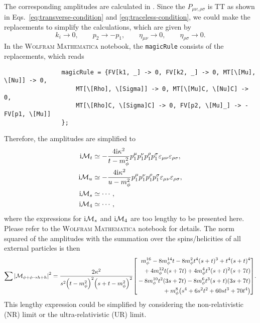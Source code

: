 \documentclass{article}
\begin{document}
            The corresponding amplitudes are calculated in .
            Since the $P_{\mu\nu, \rho\sigma}$ is TT as shown in Eqs.~\eqref{eq:transverse-condition} and \eqref{eq:traceless-condition}, we could make the replacements to simplify the calculations, which are given by
            \begin{equation}
                k_i \to 0, \qquad p_2 \to -p_1, \qquad \eta_{\mu\nu} \to 0, \qquad \eta_{\rho\sigma} \to 0.
            \end{equation}
            In the \textsc{Wolfram Mathematica} notebook, the \texttt{magicRule} consists of the replacements, which reads
            \begin{verbatim}
                magicRule = {FV[k1, _] -> 0, FV[k2, _] -> 0, MT[\[Mu], \[Nu]] -> 0, 
                    MT[\[Rho], \[Sigma]] -> 0, MT[\[Mu]C, \[Nu]C] -> 0, 
                    MT[\[Rho]C, \[Sigma]C] -> 0, FV[p2, \[Mu]_] -> -FV[p1, \[Mu]]
                };
            \end{verbatim}
            Therefore, the amplitudes are simplified to
            \begin{align}
                \iM[t] & \simeq -\frac{4 \ii \kappa^2}{t - m_\phi^2} p_1^\mu p_1^\nu p_1^\rho p_1^\sigma \varepsilon_{\mu\nu} \varepsilon_{\rho\sigma}, \\
                \iM[u] & \simeq -\frac{4 \ii \kappa^2}{u - m_\phi^2} p_1^\mu p_1^\nu p_1^\rho p_1^\sigma \varepsilon_{\mu\nu} \varepsilon_{\rho\sigma}, \\
                \iM[s] & \simeq \cdots, \\
                \iM[4] & \simeq \cdots,
            \end{align}
            where the expressions for $\iM[s]$ and $\iM[4]$ are too lengthy to be presented here.
            Please refer to the \textsc{Wolfram Mathematica} notebook for details.
            The norm squared of the amplitudes with the summation over the spins/helicities of all external particles is then
            \begin{equation}
                \sumMsqr[\phi + \phi \to h + h] = \frac{2 \kappa^2}{s^2 \qty(t - m_\phi^2)^2 \qty(s + t - m_\phi^2)^2} \qty[
                    \begin{aligned}
                        m_\phi^{16} - 8 m_\phi^{14} t - 8 m_\phi^2 t^4 (s + t)^3 + t^4 (s + t)^4 \\
                        {} + 4 m_\phi^{12} t (s + 7 t) + 4 m_\phi^4 t^3 (s + t)^2 (s + 7 t) \\
                        {} - 8 m_\phi^{10} t^2 (3 s + 7 t) - 8 m_\phi^6 t^3 (s + t) (3 s + 7 t) \\
                        {} + m_\phi^8 \qty(s^4 + 6 s^2 t^2 + 60 s t^3 + 70 t^4)
                    \end{aligned}
                ].
            \end{equation}
            This lengthy expression could be simplified by considering the non-relativistic (NR) limit or the ultra-relativistic (UR) limit.
\end{document}
